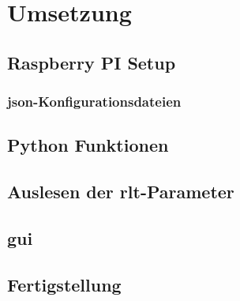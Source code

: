 \chapter{Umsetzung}

\section{Raspberry PI Setup}
\setAuthor{\pezze}


\setAuthor{\mangeng}


\subsection{\acs{json}-Konfigurationsdateien}
\setAuthor{\pezze}


\setAuthor{\schneider}


\section{Python Funktionen}
\setAuthor{\pezze}


\section{Auslesen der \acs{rlt}-Parameter}
\setAuthor{\schneider}



\section{\acf{gui}}
\setAuthor{\pezze}



\section{Fertigstellung}
\setAuthor{\schneider}


\setAuthor{\pezze}



